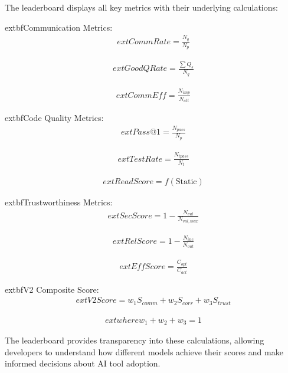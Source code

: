 \documentclass[conference]{IEEEtran}
\begin{document}
The leaderboard displays all key metrics with their underlying calculations:

	extbf{Communication Metrics:}
\begin{align}
    	ext{CommRate} = \frac{N_{q}}{N_{p}}
\end{align}

\begin{align}
    	ext{GoodQRate} = \frac{\sum Q_{s}}{N_{q}}
\end{align}

\begin{align}
    	ext{CommEff} = \frac{N_{imp}}{N_{att}}
\end{align}

	extbf{Code Quality Metrics:}
\begin{align}
    	ext{Pass@1} = \frac{N_{pass}}{N_{p}}
\end{align}

\begin{align}
        	ext{TestRate} = \frac{N_{tpass}}{N_{t}}
\end{align}

\begin{align}
        	ext{ReadScore} = f(\text{Static})
\end{align}

    	extbf{Trustworthiness Metrics:}
\begin{align}
        	ext{SecScore} = 1 - \frac{N_{vul}}{N_{vul,max}}
\end{align}

\begin{align}
        	ext{RelScore} = 1 - \frac{N_{inc}}{N_{out}}
\end{align}

\begin{align}
        	ext{EffScore} = \frac{C_{opt}}{C_{act}}
\end{align}

	extbf{V2 Composite Score:}
\begin{align}
    	ext{V2Score} = w_1 S_{comm} + w_2 S_{corr} + w_3 S_{trust}
\end{align}

\begin{align}
    	ext{where } w_1 + w_2 + w_3 = 1
\end{align}

The leaderboard provides transparency into these calculations, allowing developers to understand how different models achieve their scores and make informed decisions about AI tool adoption.
\end{document}
